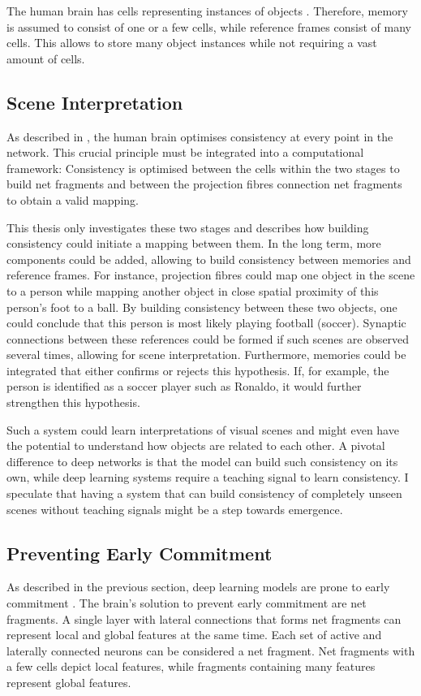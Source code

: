 The human brain has cells representing instances of objects .
Therefore, memory is assumed to consist of one or a few cells, while reference frames consist of many cells.
This allows to store many object instances while not requiring a vast amount of cells.


\subsection{Scene Interpretation}
As described in , the human brain optimises consistency at every point in the network.
This crucial principle must be integrated into a computational framework: Consistency is optimised between the cells within the two stages to build net fragments and between the projection fibres connection net fragments to obtain a valid mapping.

This thesis only investigates these two stages and describes how building consistency could initiate a mapping between them. In the long term, more components could be added, allowing to build consistency between memories and reference frames.
For instance, projection fibres could map one object in the scene to a person while mapping another object in close spatial proximity of this person's foot to a ball. By building consistency between these two objects, one could conclude that this person is most likely playing football (soccer). Synaptic connections between these references could be formed if such scenes are observed several times, allowing for scene interpretation.
Furthermore, memories could be integrated that either confirms or rejects this hypothesis. If, for example, the person is identified as a soccer player such as Ronaldo, it would further strengthen this hypothesis.

Such a system could learn interpretations of visual scenes and might even have the potential to understand how objects are related to each other. A pivotal difference to deep networks is that the model can build such consistency on its own, while deep learning systems require a teaching signal to learn consistency.
I speculate that having a system that can build consistency of completely unseen scenes without teaching signals might be a step towards emergence.


\subsection{Preventing Early Commitment}
As described in the previous section, deep learning models are prone to early commitment .
The brain's solution to prevent early commitment are net fragments.
A single layer with lateral connections that forms net fragments can represent local and global features at the same time.
Each set of active and laterally connected neurons can be considered a net fragment. Net fragments with a few cells depict local features, while fragments containing many features represent global features.


